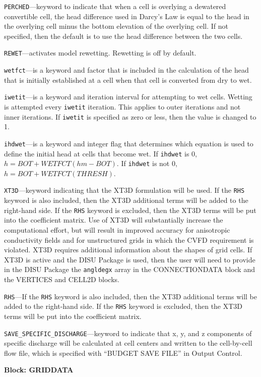 \begin{description}
\item \texttt{PERCHED}---keyword to indicate that when a cell is overlying a dewatered convertible cell, the head difference used in Darcy's Law is equal to the head in the overlying cell minus the bottom elevation of the overlying cell.  If not specified, then the default is to use the head difference between the two cells.

\item \texttt{REWET}---activates model rewetting.  Rewetting is off by default.

\item \texttt{wetfct}---is a keyword and factor that is included in the calculation of the head that is initially established at a cell when that cell is converted from dry to wet.

\item \texttt{iwetit}---is a keyword and iteration interval for attempting to wet cells. Wetting is attempted every \texttt{iwetit} iteration. This applies to outer iterations and not inner iterations. If \texttt{iwetit} is specified as zero or less, then the value is changed to 1.

\item \texttt{ihdwet}---is a keyword and integer flag that determines which equation is used to define the initial head at cells that become wet.  If \texttt{ihdwet} is 0, $h = BOT + WETFCT (hm - BOT)$. If \texttt{ihdwet} is not 0, $h = BOT + WETFCT (THRESH)$.

\item \texttt{XT3D}---keyword indicating that the XT3D formulation will be used.  If the \texttt{RHS} keyword is also included, then the XT3D additional terms will be added to the right-hand side.  If the \texttt{RHS} keyword is excluded, then the XT3D terms will be put into the coefficient matrix.  Use of XT3D will substantially increase the computational effort, but will result in improved accuracy for anisotropic conductivity fields and for unstructured grids in which the CVFD requirement is violated.  XT3D requires additional information about the shapes of grid cells.  If XT3D is active and the DISU Package is used, then the user will need to provide in the DISU Package the \texttt{angldegx} array in the CONNECTIONDATA block and the VERTICES and CELL2D blocks.

\item \texttt{RHS}---If the \texttt{RHS} keyword is also included, then the XT3D additional terms will be added to the right-hand side.  If the \texttt{RHS} keyword is excluded, then the XT3D terms will be put into the coefficient matrix.

\item \texttt{SAVE\_SPECIFIC\_DISCHARGE}---keyword to indicate that x, y, and z components of specific discharge will be calculated at cell centers and written to the cell-by-cell flow file, which is specified with ``BUDGET SAVE FILE'' in Output Control.

\end{description}
\item \textbf{Block: GRIDDATA}

